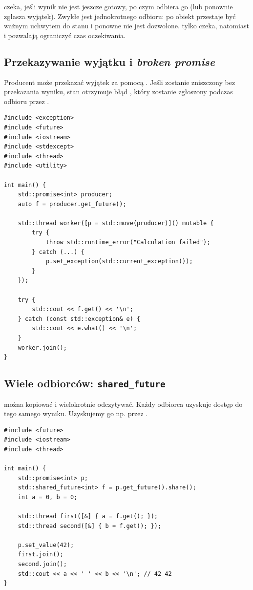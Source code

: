  czeka, jeśli wynik nie jest jeszcze gotowy, po czym
odbiera go (lub ponownie zgłasza wyjątek). Zwykłe 
jest jednokrotnego odbioru: po  obiekt przestaje być
ważnym uchwytem do stanu i ponowne  nie jest dozwolone.
 tylko czeka, natomiast  i 
pozwalają ograniczyć czas oczekiwania.

\subsection{Przekazywanie wyjątku i \emph{broken promise}}

Producent może przekazać wyjątek za pomocą .
Jeśli  zostanie zniszczony bez przekazania wyniku,
stan otrzymuje błąd , który zostanie zgłoszony
podczas odbioru przez .

\begin{lstlisting}[caption={Przekazanie wyjątku przez promise (C++14).}]
#include <exception>
#include <future>
#include <iostream>
#include <stdexcept>
#include <thread>
#include <utility>

int main() {
    std::promise<int> producer;
    auto f = producer.get_future();

    std::thread worker([p = std::move(producer)]() mutable {
        try {
            throw std::runtime_error("Calculation failed");
        } catch (...) {
            p.set_exception(std::current_exception());
        }
    });

    try {
        std::cout << f.get() << '\n';
    } catch (const std::exception& e) {
        std::cout << e.what() << '\n';
    }
    worker.join();
}
\end{lstlisting}

\subsection{Wiele odbiorców: \texttt{shared\_future}}

 można kopiować i wielokrotnie odczytywać.
Każdy odbiorca uzyskuje dostęp do tego samego wyniku. Uzyskujemy go
np. przez .

\begin{lstlisting}[caption={Dwa wątki odczytują ten sam wynik (C++11).}]
#include <future>
#include <iostream>
#include <thread>

int main() {
    std::promise<int> p;
    std::shared_future<int> f = p.get_future().share();
    int a = 0, b = 0;

    std::thread first([&] { a = f.get(); });
    std::thread second([&] { b = f.get(); });

    p.set_value(42);
    first.join();
    second.join();
    std::cout << a << ' ' << b << '\n'; // 42 42
}
\end{lstlisting}

